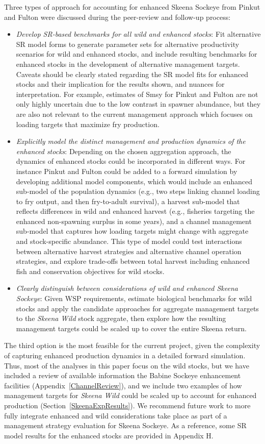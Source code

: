 \documentclass[french,11pt]{book}
\begin{document}
Three types of approach for accounting for enhanced Skeena Sockeye from Pinkut and Fulton were discussed during the peer-review and follow-up process:
\begin{itemize}

\item
  \emph{Develop SR-based benchmarks for all wild and enhanced stocks}: Fit alternative SR model forms to generate parameter sets for alternative productivity scenarios for wild and enhanced stocks, and include resulting benchmarks for enhanced stocks in the development of alternative management targets. Caveats should be clearly stated regarding the SR model fits for enhanced stocks and their implication for the results shown, and nuances for interpretation. For example, estimates of Smsy for Pinkut and Fulton are not only highly uncertain due to the low contrast in spawner abundance, but they are also not relevant to the current management approach which focuses on loading targets that maximize fry production.
\item
  \emph{Explicitly model the distinct management and production dynamics of the enhanced stocks}: Depending on the chosen aggregation approach, the dynamics of enhanced stocks could be incorporated in different ways. For instance Pinkut and Fulton could be added to a forward simulation by developing additional model components, which would include an enhanced sub-model of the population dynamics (e.g., two steps linking channel loading to fry output, and then fry-to-adult survival), a harvest sub-model that reflects differences in wild and enhanced harvest (e.g., fisheries targeting the enhanced non-spawning surplus in some years), and a channel management sub-model that captures how loading targets might change with aggregate and stock-specific abundance. This type of model could test interactions between alternative harvest strategies and alternative channel operation strategies, and explore trade-offs between total harvest including enhanced fish and conservation objectives for wild stocks.
\item
  \emph{Clearly distinguish between considerations of wild and enhanced Skeena Sockeye}: Given WSP requirements, estimate biological benchmarks for wild stocks and apply the candidate approaches for aggregate management targets to the \emph{Skeena Wild} stock aggregate, then explore how the resulting management targets could be scaled up to cover the entire Skeena return.
\end{itemize}
The third option is the most feasible for the current project, given the complexity of capturing enhanced production dynamics in a detailed forward simulation. Thus, most of the analyses in this paper focus on the wild stocks, but we have included a review of available information the Babine Sockeye enhancement facilities (Appendix~\ref{ChannelReview}), and we include two examples of how management targets for \emph{Skeena Wild} could be scaled up to account for enhanced production (Section~\ref{SkeenaExpResults}). We recommend future work to more fully integrate enhanced and wild considerations take place as part of a management strategy evaluation for Skeena Sockeye. As a reference, some SR model results for the enhanced stocks are provided in Appendix H.
\end{document}
